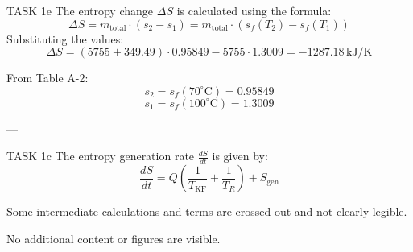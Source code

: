 TASK 1e  
The entropy change \( \Delta S \) is calculated using the formula:  
\[
\Delta S = m_{\text{total}} \cdot (s_2 - s_1) = m_{\text{total}} \cdot \left( s_f(T_2) - s_f(T_1) \right)
\]  
Substituting the values:  
\[
\Delta S = (5755 + 349.49) \cdot 0.95849 - 5755 \cdot 1.3009 = -1287.18 \, \text{kJ/K}
\]  

From Table A-2:  
\[
s_2 = s_f(70^\circ\text{C}) = 0.95849
\]  
\[
s_1 = s_f(100^\circ\text{C}) = 1.3009
\]  

---

TASK 1c  
The entropy generation rate \( \frac{dS}{dt} \) is given by:  
\[
\frac{dS}{dt} = Q \left( \frac{1}{T_{\text{KF}}} + \frac{1}{T_R} \right) + S_{\text{gen}}
\]  

Some intermediate calculations and terms are crossed out and not clearly legible.  

No additional content or figures are visible.
